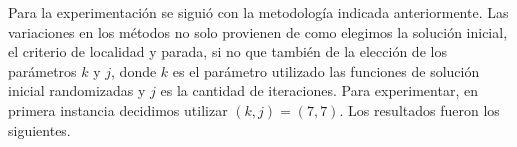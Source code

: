 

Para la experimentación se siguió con la metodología indicada anteriormente. Las variaciones en los  métodos  no solo provienen de como elegimos la solución inicial, el criterio de localidad y parada, si no que también de la elección de los parámetros $k$ y $j$, donde $k$ es el parámetro utilizado las funciones de solución inicial randomizadas y $j$ es la cantidad de iteraciones. Para experimentar, en primera instancia decidimos utilizar $(k,j) = (7, 7)$. Los resultados fueron los siguientes.

